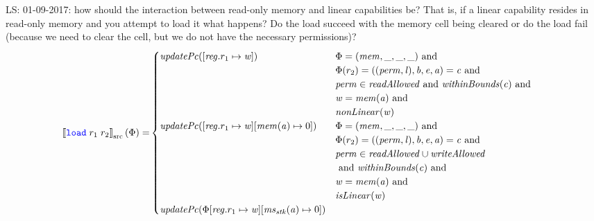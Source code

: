 \documentclass[a4paper]{article}
\newcommand\lau[1]{{\color{purple} \sf \footnotesize {LS: #1}}\\}
\newcommand{\sem}[1]{\left\llbracket #1 \right\rrbracket}
\newcommand{\ssem}[2][\Phi]{\sem{#2}_{\mathrm{src}}(#1)}
\newcommand{\tand}{\text{ and }}
\newcommand{\sourcecolor}[1]{\color{blue}}
\newcommand{\src}[1]{{\sourcecolor{} #1}}
\newcommand{\zinstr}[1]{\texttt{#1}}
\newcommand{\twoinstr}[3]{
  \ifthenelse{\equal{#2#3}{}}
  {\zinstr{#1}}
  {\zinstr{#1} \; #2 \; #3}
}
\newcommand{\sload}[2]{\twoinstr{\src{load}}{#1}{#2}}
\newcommand{\update}[2]{[#1 \mapsto #2]}
\newcommand{\perm}{\var{perm}}
\newcommand{\lin}{\var{l}}
\newcommand{\var}[1]{\mathit{#1}}
\newcommand{\reg}{\var{reg}}
\newcommand{\mem}{\var{mem}}
\newcommand{\ms}{\var{ms}}
\newcommand{\stk}{\var{stk}}
\newcommand{\baddr}{\var{b}}
\newcommand{\eaddr}{\var{e}}
\newcommand{\aaddr}{\var{a}}
\newcommand{\plainfun}[2]{
  \ifthenelse{\equal{#2}{}}
  {\mathit{#1}}
  {\mathit{#1}(#2)}
}
\newcommand{\updPcAddr}[1]{\plainfun{updatePc}{#1}}
\newcommand{\readAllowed}[1]{\plainfun{readAllowed}{#1}}
\newcommand{\writeAllowed}[1]{\plainfun{writeAllowed}{#1}}
\newcommand{\nonLinear}[1]{\plainfun{nonLinear}{#1}}
\newcommand{\isLinear}[1]{\plainfun{isLinear}{#1}}
\newcommand{\withinBounds}[1]{\plainfun{withinBounds}{#1}}
\begin{document}
\lau{01-09-2017: how should the interaction between read-only memory and linear capabilities be? That is, if a linear capability resides in read-only memory and you attempt to load it what happens? Do the load succeed with the memory cell being cleared or do the load fail (because we need to clear the cell, but we do not have the necessary permissions)? }
\begin{align*}
  \ssem{\sload{r_1}{r_2}} = & 
                              \begin{cases}
                                \updPcAddr{\update{\reg.r_1}{\var{w}}} &
                                \arraycolsep=0pt
                                \begin{array}[t]{l}
                                  \Phi = (\mem, \_, \_, \_) \tand \\
                                  \Phi(r_2) = ((\perm,\lin),\baddr,\eaddr,\aaddr) = \var{c} \tand\\
                                  \perm \in \readAllowed{} \tand \withinBounds{\var{c}} \tand \\
                                  \var{w} = \mem(\aaddr) \tand \\
                                  \nonLinear{\var{w}}
                                \end{array}\\
                                \updPcAddr{\update{\reg.r_1}{\var{w}}\update{\mem(\aaddr)}{0}} &
                                \arraycolsep=0pt
                                \begin{array}[t]{l}
                                  \Phi = (\mem, \_, \_, \_) \tand \\
                                  \Phi(r_2) = ((\perm,\lin),\baddr,\eaddr,\aaddr) = \var{c} \tand\\
                                  \perm \in \readAllowed{} \cup \writeAllowed{} \\
                                  \tand \withinBounds{\var{c}} \tand \\
                                  \var{w} = \mem(\aaddr) \tand \\
                                  \isLinear{\var{w}}
                                \end{array}\\
                                \updPcAddr{\Phi\update{\reg.r_1}{\var{w}}\update{\ms_\stk(\aaddr)}{0}} & 
                                \arraycolsep=0pt

\end{cases}
\end{align*}
\end{document}
